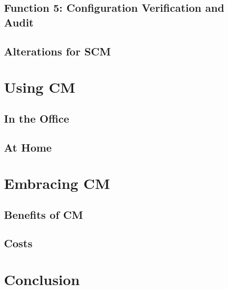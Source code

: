 \documentclass[cmpstyle]{ueacmpstyle}
\begin{document}
		\subsection{Function 5: Configuration Verification and Audit} \label{sec:audit}
		
		\subsection{Alterations for SCM} \label{sec:scm-alterations}
	
	\section{Using CM} \label{sec:using}
	
		\subsection{In the Office} \label{sec:office}
		
		\subsection{At Home} \label{sec:home}
		
	\section{Embracing CM} \label{sec:embracing}
	
		\subsection{Benefits of CM} \label{sec:benefits}
		
		\subsection{Costs} \label{sec:costs}
		
	\section{Conclusion} \label{sec:conc}
	
	
	
\end{document}
